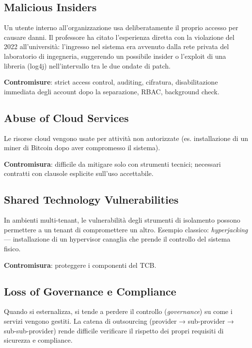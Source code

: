 \documentclass[
  italian,
  openany]{book}
\begin{document}
\subsection{Malicious Insiders}\label{malicious-insiders}

Un utente interno all'organizzazione usa deliberatamente il proprio
accesso per causare danni. Il professore ha citato l'esperienza diretta
con la violazione del 2022 all'università: l'ingresso nel sistema era
avvenuto dalla rete privata del laboratorio di ingegneria, suggerendo un
possibile insider o l'exploit di una libreria (log4j) nell'intervallo
tra le due ondate di patch.

\textbf{Contromisure}: strict access control, auditing, cifratura,
disabilitazione immediata degli account dopo la separazione, RBAC,
background check.

\subsection{Abuse of Cloud Services}\label{abuse-of-cloud-services}

Le risorse cloud vengono usate per attività non autorizzate (es.
installazione di un miner di Bitcoin dopo aver compromesso il sistema).

\textbf{Contromisura}: difficile da mitigare solo con strumenti tecnici;
necessari contratti con clausole esplicite sull'uso accettabile.

\subsection{Shared Technology
Vulnerabilities}\label{shared-technology-vulnerabilities}

In ambienti multi-tenant, le vulnerabilità degli strumenti di isolamento
possono permettere a un tenant di compromettere un altro. Esempio
classico: \emph{hyperjacking} --- installazione di un hypervisor
canaglia che prende il controllo del sistema fisico.

\textbf{Contromisura}: proteggere i componenti del TCB.

\subsection{Loss of Governance e
Compliance}\label{loss-of-governance-e-compliance}

Quando si esternalizza, si tende a perdere il controllo
(\emph{governance}) su come i servizi vengono gestiti. La catena di
outsourcing (provider → sub-provider → sub-sub-provider) rende difficile
verificare il rispetto dei propri requisiti di sicurezza e compliance.
\end{document}
